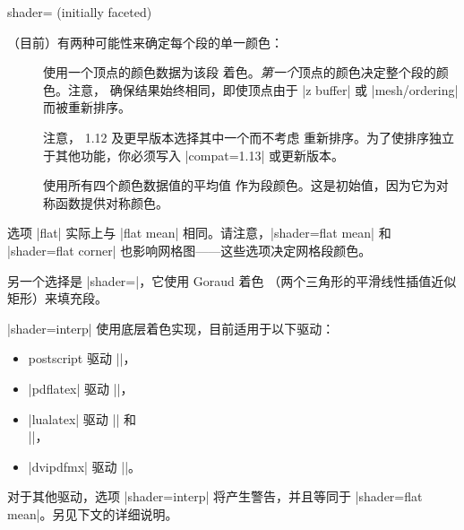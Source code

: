 {\begin{pgfplotskey}{shader= (initially faceted)%
}
\pgfplotsexpensiveexample
\begin{codeexample}[]
\end{codeexample}

    \noindent （目前）有两种可能性来确定每个段的单一颜色：
    \begin{description}
        \item[] 使用一个顶点的颜色数据为该段
            着色。\emph{第一个}顶点的颜色决定整个段的颜色。注意，
            \PGFPlots{} 确保结果始终相同，即使顶点由于 |z buffer| 或
            |mesh/ordering| 而被重新排序。

            注意，\PGFPlots{} 1.12 及更早版本选择其中一个而不考虑
            重新排序。为了使排序独立于其他功能，你必须写入
            |compat=1.13| 或更新版本。
        \item[] 使用所有四个颜色数据值的平均值
            作为段颜色。这是初始值，因为它为对称函数提供对称颜色。
    \end{description}
    选项 |flat| 实际上与 |flat mean| 相同。请注意，|shader=flat mean|
    和 |shader=flat corner| 也影响网格图——这些选项决定网格段颜色。

    另一个选择是 |shader=|，它使用 Goraud 着色
    （两个三角形的平滑线性插值近似矩形）来填充段。

\pgfplotsexpensiveexample
\begin{codeexample}[]
\end{codeexample}

    |shader=interp| 使用底层着色实现，目前适用于以下驱动：
    \begin{itemize}
        \item postscript 驱动 |\def\pgfsysdriver{pgfsys-dvips.def}|，
        \item |pdflatex| 驱动 |\def\pgfsysdriver{pgfsys-pdftex.def}|，
        \item |lualatex| 驱动 |\def\pgfsysdriver{pgfsys-pdftex.def}| 和
            \\ |\def\pgfsysdriver{pgfsys-luatex.def}|，
        \item |dvipdfmx| 驱动 |\def\pgfsysdriver{pgfsys-dvipdfmx.def}|。
    \end{itemize}
    对于其他驱动，选项 |shader=interp| 将产生警告，并且等同于
    |shader=flat mean|。另见下文的详细说明。


\end{pgfplotskey}}
